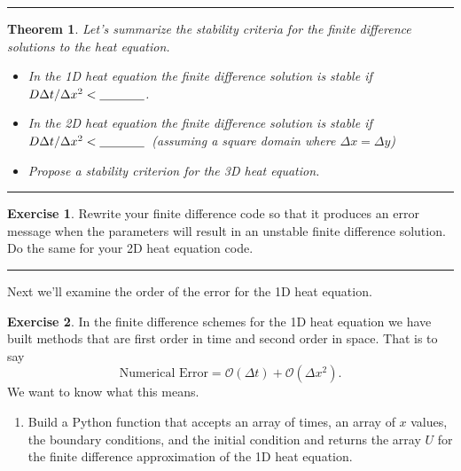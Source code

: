 \documentclass[
]{book}
\providecommand{\tightlist}{%
  \setlength{\itemsep}{0pt}\setlength{\parskip}{0pt}}
\newtheorem{theorem}{Theorem}[chapter]
\theoremstyle{definition}
\theoremstyle{definition}
\theoremstyle{definition}
\newtheorem{exercise}{Exercise}[chapter]
\theoremstyle{remark}
\begin{document}
\begin{center}\rule{0.5\linewidth}{0.5pt}\end{center}

\begin{theorem}
\protect\hypertarget{thm:unnamed-chunk-569}{}{\label{thm:unnamed-chunk-569} }Let's summarize the stability criteria for the finite difference solutions to the heat equation.

\begin{itemize}
\tightlist
\item
  In the 1D heat equation the finite difference solution is stable if \(D \Delta t / \Delta x^2 < \underline{\hspace{0.5in}}\).
\item
  In the 2D heat equation the finite difference solution is stable if \(D \Delta t / \Delta x^2 < \underline{\hspace{0.5in}}\)~(assuming a square domain where \(\Delta x = \Delta y\))
\item
  Propose a stability criterion for the 3D heat equation.
\end{itemize}
\end{theorem}

\begin{center}\rule{0.5\linewidth}{0.5pt}\end{center}

\begin{exercise}
\protect\hypertarget{exr:unnamed-chunk-570}{}{\label{exr:unnamed-chunk-570} }Rewrite your finite difference code so that it produces an error message when the parameters will result in an unstable finite difference solution. Do the same for your 2D heat equation code.
\end{exercise}

\begin{center}\rule{0.5\linewidth}{0.5pt}\end{center}

Next we'll examine the order of the error for the 1D heat equation.

\begin{exercise}
\protect\hypertarget{exr:unnamed-chunk-571}{}{\label{exr:unnamed-chunk-571} }In the finite difference schemes for the 1D heat equation we have built methods that are first order in time and second order in space. That is to say
\[ \text{Numerical Error} = \mathcal{O}(\Delta t) + \mathcal{O}(\Delta x^2). \]
We want to know what this means.

\begin{enumerate}
\def\labelenumi{\alph{enumi}.}
\tightlist
\item
  Build a Python function that accepts an array of times, an array of \(x\) values, the boundary conditions, and the initial condition and returns the array \(U\) for the finite difference approximation of the 1D heat equation.
\end{enumerate}
\end{exercise}
\end{document}
